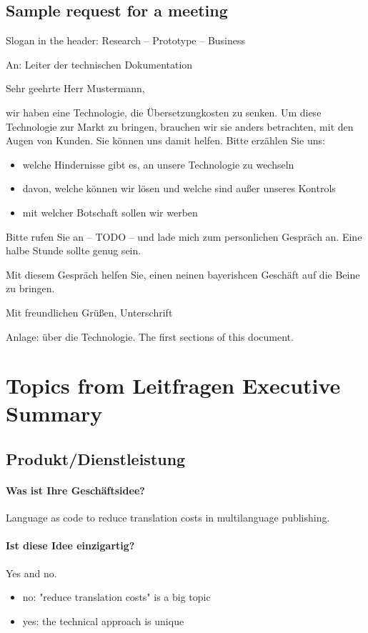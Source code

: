 \documentclass{article}
\begin{document}
\subsection{Sample request for a meeting}

Slogan in the header: Research -- Prototype -- Business

An: Leiter der technischen Dokumentation

Sehr geehrte Herr Mustermann,

wir haben eine Technologie, die Übersetzungkosten zu senken. Um diese Technologie zur Markt zu bringen, brauchen wir sie anders betrachten, mit den Augen von Kunden. Sie können uns damit helfen. Bitte erzählen Sie uns:

\begin{itemize}
\item welche Hindernisse gibt es, an unsere Technologie zu wechseln
\item davon, welche können wir lösen und welche sind außer unseres Kontrols
\item mit welcher Botschaft sollen wir werben
\end{itemize}

Bitte rufen Sie an -- TODO -- und lade mich zum personlichen Gespräch an. Eine halbe Stunde sollte genug sein.

Mit diesem Gespräch helfen Sie, einen neinen bayerishcen Geschäft auf die Beine zu bringen.

Mit freundlichen Grüßen, Unterschrift

Anlage: über die Technologie. The first sections of this document.


\section{Topics from Leitfragen Executive Summary}

\subsection{Produkt/Dienstleistung}

\paragraph{Was ist Ihre Geschäftsidee?} Language as code to reduce translation costs in multilanguage publishing.

\paragraph{Ist diese Idee einzigartig?}
Yes and no.
\begin{itemize}
\item no: "reduce translation costs" is a big topic
\item yes: the technical approach is unique
\end{itemize}
\end{document}

